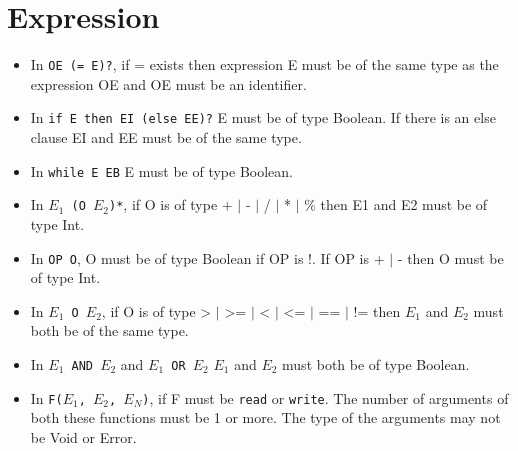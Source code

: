 \section{Expression}
\begin{itemize}

\item In \texttt{OE (= E)?}, if = exists then expression E must be of the same type as the expression OE and OE must be an identifier.

\item In \texttt{if E then EI (else EE)?} E must be of type Boolean. If there is an else clause EI and EE must be of the same type.

\item In \texttt{while E EB} E must be of type Boolean.

\item In \texttt{$E_1$ (O $E_2$)*}, if O is of type + $\mid$ - $\mid$ / $\mid$ * $\mid$ \% then E1 and E2 must be of type Int. 

\item In \texttt{OP O}, O must be of type Boolean if OP is !. If OP is + $\mid$ - then O must be of type Int. 

\item In \texttt{$E_1$ O $E_2$}, if O is of type > $\mid$ >= $\mid$ < $\mid$ <= $\mid$ == $\mid$ != then $E_1$ and $E_2$ must both be of the same type. 

\item In \texttt{$E_1$ AND $E_2$} and \texttt{$E_1$ OR $E_2$} $E_1$ and $E_2$ must both be of type Boolean. 

\item In \texttt{F($E_1$, $E_2$, $E_N$)}, if F must be \texttt{read} or \texttt{write}. The number of arguments of both these functions must be 1 or more. The type of the arguments may not be Void or Error.

\end{itemize}

